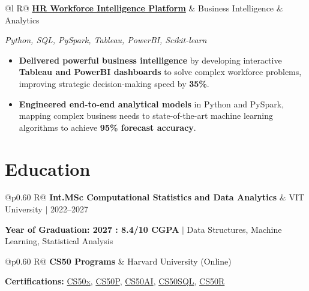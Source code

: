 \documentclass[a4paper,11pt]{article}
\newcommand{\subheading}[1]{\textbf{#1}}
\newcommand{\meta}[1]{{\fontsize{10}{12}\selectfont\textcolor[HTML]{3A3A3A}{#1}}}
\newcommand{\techstack}[1]{{\fontsize{10}{12}\selectfont\textcolor[HTML]{1A1A1A}{\textit{#1}}}}
\newcommand{\ulink}[2]{\href{#1}{#2}}
\begin{document}
\begin{tabularx}{\linewidth}{@{}l R@{}}
\subheading{\ulink{https://github.com/su-jin1425/HR-Workforce-Intelligence-Platform}{HR Workforce Intelligence Platform}} & \meta{Business Intelligence \& Analytics}
\end{tabularx}
\techstack{Python, SQL, PySpark, Tableau, PowerBI, Scikit-learn}
\begin{itemize}[nosep, leftmargin=1.5em, itemsep=2pt, topsep=2pt]
  \item {\color[HTML]{0A0A0A}\fontsize{11}{14}\selectfont \textbf{Delivered powerful business intelligence} by developing interactive \textbf{Tableau and PowerBI dashboards} to solve complex workforce problems, improving strategic decision-making speed by \textbf{35\%}.}
  \item {\color[HTML]{0A0A0A}\fontsize{11}{14}\selectfont \textbf{Engineered end-to-end analytical models} in Python and PySpark, mapping complex business needs to state-of-the-art machine learning algorithms to achieve \textbf{95\% forecast accuracy}.}
\end{itemize}

\section{Education}
\vspace{2pt}

\begin{tabularx}{\linewidth}{@{}p{0.60\linewidth} R@{}}
\subheading{Int.MSc Computational Statistics and Data Analytics} & \meta{VIT University $|$ 2022--2027}
\end{tabularx}
{\color[HTML]{3A3A3A}\fontsize{11}{14}\selectfont \textbf{Year of Graduation: 2027 : 8.4/10 CGPA} $|$ Data Structures, Machine Learning, Statistical Analysis}

\begin{tabularx}{\linewidth}{@{}p{0.60\linewidth} R@{}}
\subheading{CS50 Programs} & \meta{Harvard University (Online)}
\end{tabularx}
{\color[HTML]{3A3A3A}\fontsize{11}{14}\selectfont \textbf{Certifications:} \ulink{https://cs50.harvard.edu/certificates/b14b78df-e05c-413e-a607-1dd27303053a}{CS50x}, \ulink{https://cs50.harvard.edu/certificates/32477052-9db4-49c4-a5a4-d7e58429ca2c}{CS50P}, \ulink{https://cs50.harvard.edu/certificates/9cdb4d4a-1250-4f8e-9fd7-191864e0f919}{CS50AI}, \ulink{https://cs50.harvard.edu/certificates/bc486f24-f085-4e61-8536-80940b97a1b9}{CS50SQL}, \ulink{https://cs50.harvard.edu/certificates/666838e6-a053-4d82-b179-a60fe745fd84}{CS50R}}
\end{document}
